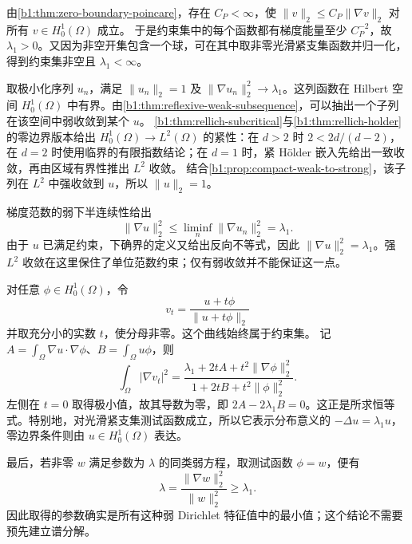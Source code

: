 \begin{solution}
由\cref{b1:thm:zero-boundary-poincare}，存在 \(C_P<\infty\)，使
\(\|v\|_2\le C_P\|\nabla v\|_2\) 对所有 \(v\in H_0^1(\Omega)\) 成立。
于是约束集中的每个函数都有梯度能量至少 \(C_P^{-2}\)，故
\(\lambda_1>0\)。又因为非空开集包含一个球，可在其中取非零光滑紧支集函数并归一化，得到约束集非空且 \(\lambda_1<\infty\)。

取极小化序列 \(u_n\)，满足 \(\|u_n\|_2=1\) 及
\(\|\nabla u_n\|_2^2\to\lambda_1\)。这列函数在 Hilbert 空间
\(H_0^1(\Omega)\) 中有界。由\cref{b1:thm:reflexive-weak-subsequence}，可以抽出一个子列在该空间中弱收敛到某个 \(u\)。
\cref{b1:thm:rellich-subcritical}与\cref{b1:thm:rellich-holder}的零边界版本给出
\(H_0^1(\Omega)\to L^2(\Omega)\) 的紧性：在 \(d>2\) 时
\(2<2d/(d-2)\)，在 \(d=2\) 时使用临界的有限指数结论；在 \(d=1\) 时，紧 Hölder 嵌入先给出一致收敛，再由区域有界性推出 \(L^2\) 收敛。
结合\cref{b1:prop:compact-weak-to-strong}，该子列在 \(L^2\) 中强收敛到
\(u\)，所以 \(\|u\|_2=1\)。

梯度范数的弱下半连续性给出
\[
 \|\nabla u\|_2^2
      \le\liminf_n\|\nabla u_n\|_2^2=\lambda_1.
\]
由于 \(u\) 已满足约束，下确界的定义又给出反向不等式，因此
\(\|\nabla u\|_2^2=\lambda_1\)。强 \(L^2\) 收敛在这里保住了单位范数约束；仅有弱收敛并不能保证这一点。

对任意 \(\phi\in H_0^1(\Omega)\)，令
\[
 v_t=\frac{u+t\phi}{\|u+t\phi\|_2}
\]
并取充分小的实数 \(t\)，使分母非零。这个曲线始终属于约束集。
记 \(A=\int_\Omega\nabla u\cdot\nabla\phi\)、\(B=\int_\Omega u\phi\)，则
\[
 \int_\Omega|\nabla v_t|^2
 =\frac{\lambda_1+2tA+t^2\|\nabla\phi\|_2^2}
        {1+2tB+t^2\|\phi\|_2^2}.
\]
左侧在 \(t=0\) 取得极小值，故其导数为零，即
\(2A-2\lambda_1B=0\)。这正是所求恒等式。特别地，对光滑紧支集测试函数成立，所以它表示分布意义的
\(-\Delta u=\lambda_1u\)，零边界条件则由 \(u\in H_0^1(\Omega)\) 表达。

最后，若非零 \(w\) 满足参数为 \(\lambda\) 的同类弱方程，取测试函数
\(\phi=w\)，便有
\[
 \lambda=\frac{\|\nabla w\|_2^2}{\|w\|_2^2}\ge\lambda_1.
\]
因此取得的参数确实是所有这种弱 Dirichlet 特征值中的最小值；这个结论不需要预先建立谱分解。
\end{solution}

